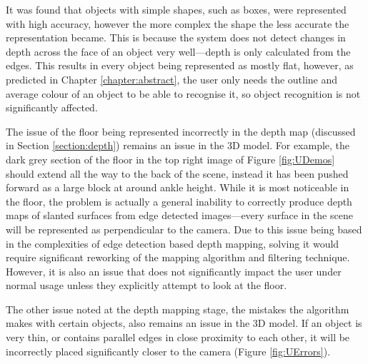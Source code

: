 It was found that objects with simple shapes, such as boxes, were represented with high accuracy, however the more complex the shape the less accurate the representation became. This is because the system does not detect changes in depth across the face of an object very well---depth is only calculated from the edges. This results in every object being represented as mostly flat, however, as predicted in Chapter \ref{chapter:abstract}, the user only needs the outline and average colour of an object to be able to recognise it, so object recognition is not significantly affected.

The issue of the floor being represented incorrectly in the depth map (discussed in Section \ref{section:depth}) remains an issue in the 3D model. For example, the dark grey section of the floor in the top right image of Figure \ref{fig:UDemos} should extend all the way to the back of the scene, instead it has been pushed forward as a large block at around ankle height. While it is most noticeable in the floor, the problem is actually a general inability to correctly produce depth maps of slanted surfaces from edge detected images---every surface in the scene will be represented as perpendicular to the camera. Due to this issue being based in the complexities of edge detection based depth mapping, solving it would require significant reworking of the mapping algorithm and filtering technique. However, it is also an issue that does not significantly impact the user under normal usage unless they explicitly attempt to look at the floor.

The other issue noted at the depth mapping stage, the mistakes the algorithm makes with certain objects, also remains an issue in the 3D model. If an object is very thin, or contains parallel edges in close proximity to each other, it will be incorrectly placed significantly closer to the camera (Figure \ref{fig:UErrors}).

